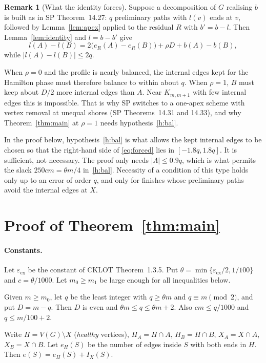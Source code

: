\documentclass[11pt]{article}
\theoremstyle{definition}
\newtheorem{remark}[theorem]{Remark}
\newcommand{\eps}{\varepsilon}
\newcommand{\epsex}{\eps_{\mathrm{ex}}}
\begin{document}
\begin{remark}[What the identity forces]\label{rem:forces}
Suppose a decomposition of $G$ realising $b$ is built as in SP Theorem~14.27: $q$ preliminary paths with $l(v)$ ends at $v$, followed by Lemma~\ref{lem:apex} applied to the residual $R$ with $b'=b-l$. Then Lemma~\ref{lem:identity} and $l=b-b'$ give
\begin{equation}\label{eq:forced}
l(A)-l(B)=2\bigl(e_R(A)-e_R(B)\bigr)+\rho D+b(A)-b(B),
\end{equation}
while $|l(A)-l(B)|\le 2q$.

When $\rho=0$ and the profile is nearly balanced, the internal edges kept for the Hamilton phase must therefore balance to within about $q$. When $\rho=1$, $B$ must keep about $D/2$ more internal edges than $A$. Near $K_{m,m+1}$ with few internal edges this is impossible. That is why SP switches to a one-apex scheme with vertex removal at unequal shores (SP Theorems~14.31 and 14.33), and why Theorem~\ref{thm:main} at $\rho=1$ needs hypothesis~\ref{h:bal}.

In the proof below, hypothesis~\ref{h:bal} is what allows the kept internal edges to be chosen so that the right-hand side of \eqref{eq:forced} lies in $[-1.8q,1.8q]$. It is sufficient, not necessary. The proof only needs $|\Lambda|\le0.9q$, which is what permits the slack $250cm=\theta m/4$ in~\ref{h:bal}. Necessity of a condition of this type holds only up to an error of order $q$, and only for finishes whose preliminary paths avoid the internal edges at $X$.
\end{remark}

\section{Proof of Theorem~\ref{thm:main}}\label{sec:proof}

\paragraph{Constants.} Let $\epsex$ be the constant of CKLOT Theorem~1.3.5. Put $\theta=\min\{\epsex/2,1/100\}$ and $c=\theta/1000$. Let $m_0\ge m_1$ be large enough for all inequalities below.

Given $m\ge m_0$, let $q$ be the least integer with $q\ge\theta m$ and $q\equiv m\pmod2$, and put $D=m-q$. Then $D$ is even and $\theta m\le q\le\theta m+2$. Also $cm\le q/1000$ and $q\le m/100+2$.

Write $H=V(G)\setminus X$ (\emph{healthy} vertices), $H_A=H\cap A$, $H_B=H\cap B$, $X_A=X\cap A$, $X_B=X\cap B$. Let $e_H(S)$ be the number of edges inside $S$ with both ends in $H$. Then $e(S)=e_H(S)+I_X(S)$.
\end{document}
